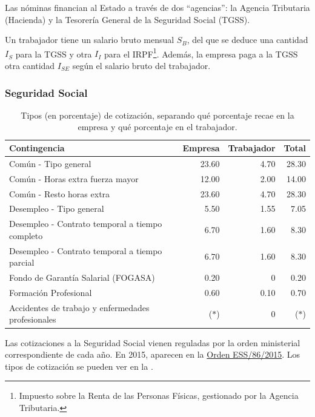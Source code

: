 \documentclass[nochap,palatino,notitlepage]{apuntes}
\begin{document}
Las nóminas financian al Estado a través de dos ``agencias'': la Agencia Tributaria (Hacienda) y la Tesorería General de la Seguridad Social (TGSS).

Un trabajador tiene un salario bruto mensual $S_B$, del que se deduce una cantidad $I_S$ para la TGSS y otra $I_I$ para el IRPF\footnote{Impuesto sobre la Renta de las Personas Físicas, gestionado por la Agencia Tributaria.}. Además, la empresa paga a la TGSS otra cantidad $I_{SE}$ según el salario bruto del trabajador.

\subsubsection{Seguridad Social}

\begin{table}[hbtp]
\centering
\footnotesize
\begin{tabular}{l|r|r|r}
\textbf{Contingencia} & \textbf{Empresa} & \textbf{Trabajador} & \textbf{Total} \\ \toprule
Común - Tipo general & 23.60 & 4.70 & 28.30 \\
Común - Horas extra fuerza mayor & 12.00 & 2.00 & 14.00 \\
Común - Resto horas extra & 23.60 & 4.70 & 28.30 \\ \midrule
Desempleo - Tipo general & 5.50 & 1.55 & 7.05 \\
Desempleo - Contrato temporal a tiempo completo & 6.70 & 1.60 & 8.30 \\
Desempleo - Contrato temporal a tiempo parcial & 6.70 & 1.60 & 8.30 \\ \midrule
Fondo de Garantía Salarial (FOGASA) & 0.20 & 0 & 0.20 \\ \midrule
Formación Profesional & 0.60 & 0.10 & 0.70 \\ \midrule
Accidentes de trabajo y enfermedades profesionales & ($\ast$) & 0 & ($\ast$) \\ \midrule
\end{tabular}
\caption{Tipos (en porcentaje) de cotización, separando qué porcentaje recae en la empresa y qué porcentaje en el trabajador.}
\label{tab:TiposSegSocial}
\end{table}

Las cotizaciones a la Seguridad Social vienen reguladas por la orden ministerial correspondiente de cada año. En 2015, aparecen en la \href{http://www.boe.es/diario_boe/txt.php?id=BOE-A-2015-847}{Orden ESS/86/2015}. Los tipos de cotización se pueden ver en la .
\end{document}
